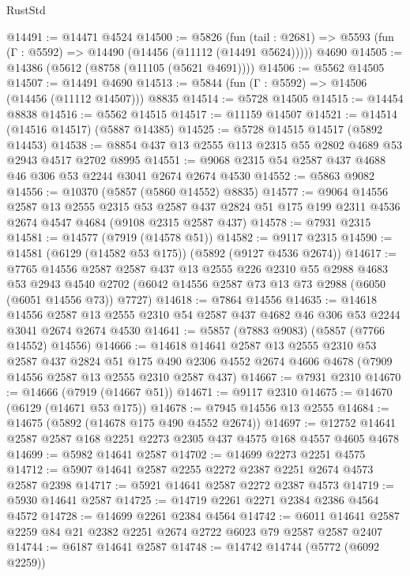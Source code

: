 \begin{lexlean}{RustStd}
\begin{coremodule}
@14491 := @14471 @4524
@14500 := @5826
    (fun (tail : @2681) => @5593 (fun (Γ : @5592) => @14490 (@14456 (@11112 (@14491 @5624)))))
    @4690
@14505 := @14386 (@5612 (@8758 (@11105 (@5621 @4691))))
@14506 := @5562 @14505
@14507 := @14491 @4690
@14513 := @5844 (fun (Γ : @5592) => @14506 (@14456 (@11112 @14507))) @8835
@14514 := @5728 @14505
@14515 := @14454 @8838
@14516 := @5562 @14515
@14517 := @11159 @14507
@14521 := @14514 (@14516 @14517) (@5887 @14385)
@14525 := @5728 @14515 @14517 (@5892 @14453)
@14538 := @8854 @437 @13 @2555 @113 @2315 @55 @2802 @4689 @53 @2943 @4517 @2702 @8995
@14551 := @9068 @2315 @54 @2587 @437 @4688 @46 @306 @53 @2244 @3041 @2674 @2674 @4530
@14552 := @5863 @9082
@14556 := @10370 (@5857 (@5860 @14552) @8835)
@14577 := @9064
    @14556
    @2587
    @13
    @2555
    @2315
    @53
    @2587
    @437
    @2824
    @51
    @175
    @199
    @2311
    @4536
    @2674
    @4547
    @4684
    (@9108 @2315 @2587 @437)
@14578 := @7931 @2315
@14581 := @14577 (@7919 (@14578 @51))
@14582 := @9117 @2315
@14590 := @14581 (@6129 (@14582 @53 @175)) (@5892 (@9127 @4536 @2674))
@14617 := @7765
    @14556
    @2587
    @2587
    @437
    @13
    @2555
    @226
    @2310
    @55
    @2988
    @4683
    @53
    @2943
    @4540
    @2702
    (@6042 @14556 @2587 @73 @13 @73 @2988 (@6050 (@6051 @14556 @73)) @7727)
@14618 := @7864 @14556
@14635 := @14618
    @14556
    @2587
    @13
    @2555
    @2310
    @54
    @2587
    @437
    @4682
    @46
    @306
    @53
    @2244
    @3041
    @2674
    @2674
    @4530
@14641 := @5857 (@7883 @9083) (@5857 (@7766 @14552) @14556)
@14666 := @14618
    @14641
    @2587
    @13
    @2555
    @2310
    @53
    @2587
    @437
    @2824
    @51
    @175
    @490
    @2306
    @4552
    @2674
    @4606
    @4678
    (@7909 @14556 @2587 @13 @2555 @2310 @2587 @437)
@14667 := @7931 @2310
@14670 := @14666 (@7919 (@14667 @51))
@14671 := @9117 @2310
@14675 := @14670 (@6129 (@14671 @53 @175))
@14678 := @7945 @14556 @13 @2555
@14684 := @14675 (@5892 (@14678 @175 @490 @4552 @2674))
@14697 := @12752 @14641 @2587 @2587 @168 @2251 @2273 @2305 @437 @4575 @168 @4557 @4605 @4678
@14699 := @5982 @14641 @2587
@14702 := @14699 @2273 @2251 @4575
@14712 := @5907 @14641 @2587 @2255 @2272 @2387 @2251 @2674 @4573 @2587 @2398
@14717 := @5921 @14641 @2587 @2272 @2387 @4573
@14719 := @5930 @14641 @2587
@14725 := @14719 @2261 @2271 @2384 @2386 @4564 @4572
@14728 := @14699 @2261 @2384 @4564
@14742 := @6011 @14641 @2587 @2259 @84 @21 @2382 @2251 @2674 @2722 @6023 @79 @2587 @2587 @2407
@14744 := @6187 @14641 @2587
@14748 := @14742 @14744 (@5772 (@6092 @2259))

\end{coremodule}
\end{lexlean}
